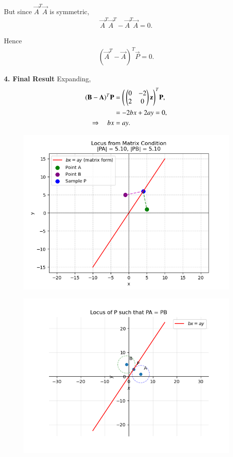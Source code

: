 \documentclass[journal]{IEEEtran}
\begin{document}
But since $\vec{A}^T\vec{A}$ is symmetric,  
\begin{align}
\vec{A}^{T}\vec{A}^{T} - \vec{A}^T\vec{A} = 0.
\end{align}

Hence
\begin{align}
(\vec{A}^T - \vec{A})^T \vec{P} = 0.
\end{align}

\medskip
\textbf{4. Final Result}
Expanding,
\begin{align}
(\mathbf{B}-\mathbf{A})^T\mathbf{P} 
&= \Bigg(\begin{pmatrix}0 & -2 \\ 2 & 0\end{pmatrix}\mathbf{z}\Bigg)^T \mathbf{P}, \\
&= -2bx + 2ay = 0, \\
\Rightarrow \quad bx &= ay.
\end{align}

\begin{figure}[H]
    \centering
    \includegraphics[width=0.9\linewidth]{figs/Fig1.png}
    \caption{}
\end{figure}

\begin{figure}[H]
    \centering
    \includegraphics[width=0.9\linewidth]{figs/fig2.png}
    \caption{}
\end{figure}
\end{document}
